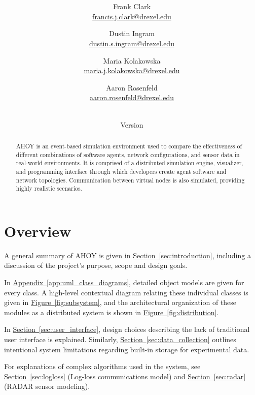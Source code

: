 \documentclass[titlepage]{article}
\title{\textbf{\mytitle}}
\author{
	Frank Clark \\\url{francis.j.clark@drexel.edu}
    \and Dustin Ingram \\\url{dustin.s.ingram@drexel.edu}
	\and Maria Kolakowska \\\url{maria.j.kolakowska@drexel.edu}
    \and Aaron Rosenfeld \\\url{aaron.rosenfeld@drexel.edu}
}
\date{\mydate\\Version \myversion}
\newcommand{\rrref}[2]{\hyperref[#2]{#1}}
\newcommand{\sref}[1]{\hyperref[#1]{Section~\ref*{#1}}}
\newcommand{\fref}[1]{\hyperref[#1]{Figure~\ref*{#1}}}
\newcommand{\aref}[1]{\hyperref[#1]{Appendix~\ref*{#1}}}
\begin{document}

\begin{figure}
    \centering
    \scalebox{0.8}{}
    \vspace{-4em}
\end{figure}

\maketitle

\begin{abstract}
AHOY is an event-based simulation environment used to compare the effectiveness of different combinations of software agents, network configurations, and sensor data in real-world environments.  It is comprised of a distributed simulation engine, visualizer, and programming interface through which developers create agent software and network topologies.  Communication between virtual nodes is also simulated, providing highly realistic scenarios.
\end{abstract}

\setcounter{tocdepth}{4}
\tableofcontents
\label{toc}
\pagebreak
\listoffigures
\label{lof}
\pagebreak
{}

\section{Overview}
A general summary of AHOY is given in \sref{sec:introduction}, including a discussion of the project's purpose, scope and design goals.

In \aref{app:uml_class_diagrams}, detailed object models are given for every class. A high-level contextual diagram relating these individual classes is given in \fref{fig:subsystem}, and the architectural organization of these modules as a distributed system is shown in \fref{fig:distribution}.

In \sref{sec:user_interface}, design choices describing the lack of traditional user interface is explained. Similarly, \sref{sec:data_collection} outlines intentional system limitations regarding built-in storage for experimental data. 

For explanations of complex algorithms used in the system, see \sref{sec:logloss} (Log-loss communications model) and \sref{sec:radar} (RADAR sensor modeling). 
\end{document}
